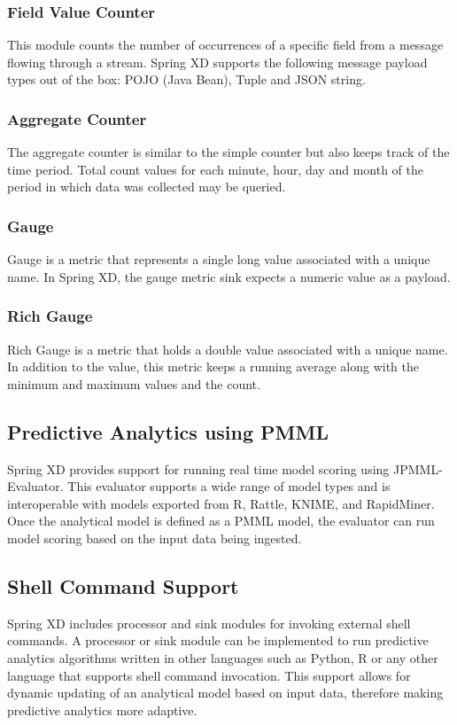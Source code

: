 \subsubsection {Field Value Counter}

This module counts the number of occurrences of a specific field from a message
flowing through a stream. Spring XD supports the following message payload types
out of the box: POJO (Java Bean), Tuple and JSON\cite{json} string.

\subsubsection {Aggregate Counter}

The aggregate counter is similar to the simple counter but also keeps track of
the time period. Total count values for each minute, hour, day and month
of the period in which data was collected may be queried.

\subsubsection {Gauge}
Gauge is a metric that represents a single long value associated with a unique name.
In Spring XD, the gauge metric sink expects a numeric value as a payload.

\subsubsection {Rich Gauge}
Rich Gauge is a metric that holds a double value associated with a unique name. In
addition to the value, this metric keeps a running average along with the minimum and
maximum values and the count.

\subsection {Predictive Analytics using PMML}
Spring XD provides support for running real time model scoring using JPMML-Evaluator.
This evaluator supports a wide range of model types and is interoperable with
models exported from R, Rattle, KNIME, and RapidMiner. Once the analytical model
is defined as a PMML model, the evaluator can run model scoring based on the 
input data being ingested.

\subsection {Shell Command Support}
Spring XD includes processor and sink modules for invoking external shell commands.
A processor or sink module can be implemented to run predictive
analytics algorithms written in other languages such as Python, R or any other language that
supports shell command invocation. This support allows for dynamic updating of
an analytical model based on input data, therefore making predictive analytics more adaptive.


